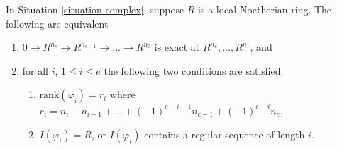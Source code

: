 \begin{proposition}
\label{proposition-what-exact}
\begin{reference}
\cite[Corollary 1]{WhatExact}
\end{reference}
In Situation \ref{situation-complex}, suppose $R$ is
a local Noetherian ring. The following are equivalent
\begin{enumerate}
\item $0 \to R^{n_e} \to R^{n_{e-1}} \to \ldots \to R^{n_0}$
is exact at $R^{n_e}, \ldots, R^{n_1}$, and
\item for all $i$, $1 \leq i \leq e$
the following two conditions are satisfied:
\begin{enumerate}
\item $\text{rank}(\varphi_i) = r_i$ where
$r_i = n_i - n_{i + 1} + \ldots + (-1)^{e-i-1} n_{e-1} + (-1)^{e-i} n_e$,
\item $I(\varphi_i) = R$, or $I(\varphi_i)$ contains a
regular sequence of length $i$.
\end{enumerate}
\end{enumerate}
\end{proposition}

